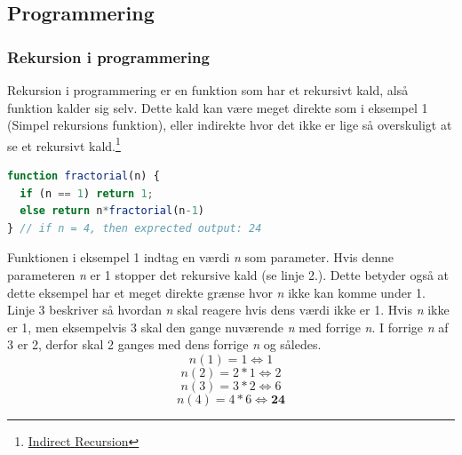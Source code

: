 \documentclass[12pt]{article}
\begin{document}
\subsection{Programmering}
\subsubsection{Rekursion i programmering}\label{Rekursion i programmering}
Rekursion i programmering er en funktion som har et rekursivt kald, alså funktion kalder sig selv. Dette kald kan være meget direkte som i eksempel 1 (Simpel rekursions funktion), eller indirekte hvor det ikke er lige så overskuligt at se et rekursivt kald.\footnote{\href{https://www.oreilly.com/library/view/functional-programming-in/9780470971109/xhtml/sec55.html}{Indirect Recursion}}
\begin{lstlisting}[language=JavaScript, caption=Simpel rekursions funktion]
function fractorial(n) {        
  if (n == 1) return 1; 
  else return n*fractorial(n-1) 
} // if n = 4, then exprected output: 24
\end{lstlisting}
Funktionen i eksempel 1 indtag en værdi \textit{n} som parameter. Hvis denne parameteren \textit{n} er 1 stopper det rekursive kald (se linje 2.). Dette betyder også at dette eksempel har et meget direkte grænse hvor \textit{n} ikke kan komme under 1. Linje 3 beskriver så hvordan \textit{n} skal reagere hvis dens værdi ikke er 1. Hvis \textit{n} ikke er 1, men eksempelvis 3 skal den gange nuværende \textit{n} med forrige \textit{n}. I forrige \textit{n} af 3 er 2, derfor skal 2 ganges med dens forrige \textit{n} og således.
\[n(1) = 1 \Leftrightarrow 1\] 
\[n(2) = 2*1 \Leftrightarrow   2\]
\[n(3) = 3*2 \Leftrightarrow   6\]
\[n(4) = 4*6 \Leftrightarrow  \textbf{24}\]

\newpage
\end{document}
